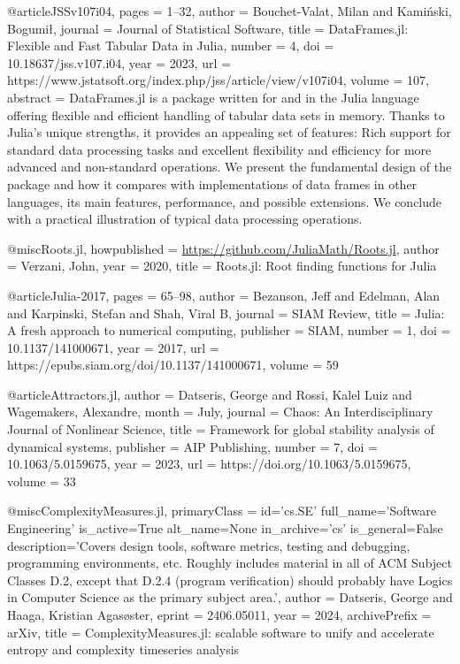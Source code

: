 @article{JSSv107i04,
 pages         = {1--32},
 author        = {Bouchet-Valat, Milan and Kamiński, Bogumił},
 journal       = {Journal of Statistical Software},
 title         = {DataFrames.jl: Flexible and Fast Tabular Data in Julia},
 number        = {4},
 doi           = {10.18637/jss.v107.i04},
 year          = {2023},
 url           = {https://www.jstatsoft.org/index.php/jss/article/view/v107i04},
 volume        = {107},
 abstract      = {DataFrames.jl is a package written for and in the Julia language offering flexible and efficient handling of tabular data sets in memory. Thanks to Julia’s unique strengths, it provides an appealing set of features: Rich support for standard data processing tasks and excellent flexibility and efficiency for more advanced and non-standard operations. We present the fundamental design of the package and how it compares with implementations of data frames in other languages, its main features, performance, and possible extensions. We conclude with a practical illustration of typical data processing operations.}
}

@misc{Roots.jl,
 howpublished  = {\url{https://github.com/JuliaMath/Roots.jl}},
 author        = {Verzani, John},
 year          = {2020},
 title         = {{Roots.jl}: Root finding functions for Julia}
}

@article{Julia-2017,
 pages         = {65--98},
 author        = {Bezanson, Jeff and Edelman, Alan and Karpinski, Stefan and Shah, Viral B},
 journal       = {SIAM {R}eview},
 title         = {Julia: A fresh approach to numerical computing},
 publisher     = {SIAM},
 number        = {1},
 doi           = {10.1137/141000671},
 year          = {2017},
 url           = {https://epubs.siam.org/doi/10.1137/141000671},
 volume        = {59}
}

@article{Attractors.jl,
 author        = {Datseris, George and Rossi, Kalel  Luiz and Wagemakers, Alexandre},
 month         = {July},
 journal       = {Chaos: An Interdisciplinary Journal of Nonlinear Science},
 title         = {Framework for global stability analysis of dynamical systems},
 publisher     = {{AIP} Publishing},
 number        = {7},
 doi           = {10.1063/5.0159675},
 year          = {2023},
 url           = {https://doi.org/10.1063/5.0159675},
 volume        = {33}
}

@misc{ComplexityMeasures.jl,
 primaryClass  = {id='cs.SE' full_name='Software Engineering' is_active=True alt_name=None in_archive='cs' is_general=False description='Covers design tools, software metrics, testing and debugging, programming environments, etc. Roughly includes material in all of ACM Subject Classes D.2, except that D.2.4 (program verification) should probably have Logics in Computer Science as the primary subject area.'},
 author        = {Datseris, George and Haaga, Kristian  Agasøster},
 eprint        = {2406.05011},
 year          = {2024},
 archivePrefix = {arXiv},
 title         = {ComplexityMeasures.jl: scalable software to unify and accelerate entropy and complexity timeseries analysis}
}
